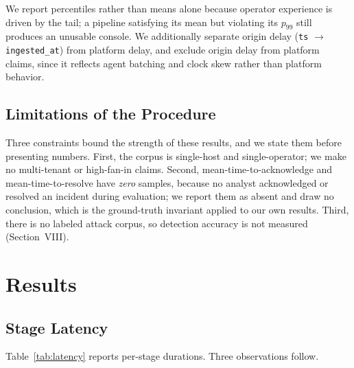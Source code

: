 \documentclass[conference]{IEEEtran}
\begin{document}
We report percentiles rather than means alone because operator experience is
driven by the tail; a pipeline satisfying its mean but violating its $p_{99}$
still produces an unusable console. We additionally separate origin delay
(\texttt{ts} $\rightarrow$ \texttt{ingested\_at}) from platform delay, and
exclude origin delay from platform claims, since it reflects agent batching
and clock skew rather than platform behavior.

\subsection{Limitations of the Procedure}

Three constraints bound the strength of these results, and we state them
before presenting numbers. First, the corpus is single-host and
single-operator; we make no multi-tenant or high-fan-in claims. Second,
mean-time-to-acknowledge and mean-time-to-resolve have \emph{zero} samples,
because no analyst acknowledged or resolved an incident during evaluation;
we report them as absent and draw no conclusion, which is the ground-truth
invariant applied to our own results. Third, there is no labeled attack
corpus, so detection accuracy is not measured (Section~VIII).

\section{Results}

\subsection{Stage Latency}

Table~\ref{tab:latency} reports per-stage durations. Three observations
follow.
\end{document}
